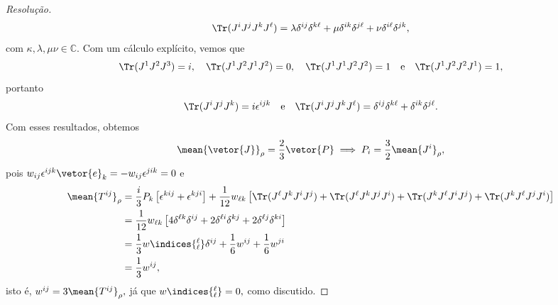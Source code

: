 \begin{proof}[Resolução]
\begin{equation*}
        \Tr(J^i J^j J^k J^\ell) = \lambda \delta^{ij} \delta^{k\ell} + \mu \delta^{i k} \delta^{j \ell} + \nu \delta^{i \ell} \delta^{jk},
    \end{equation*}
    com \(\kappa, \lambda, \mu \nu \in \mathbb{C}\). Com um cálculo explícito, vemos que 
    \begin{equation*}
        \Tr(J^1 J^2 J^3) = i,\quad\Tr(J^1 J^2 J^1 J^2) = 0,\quad \Tr(J^1 J^1 J^2 J^2) = 1\quad\text{e}\quad\Tr(J^1 J^2 J^2 J^1) = 1, 
    \end{equation*}
    portanto 
    \begin{equation*}
        \Tr(J^i J^j J^k) = i \epsilon^{ijk}
        \quad\text{e}\quad
        \Tr(J^i J^j J^k J^\ell) = \delta^{ij} \delta^{k \ell} + \delta^{ik} \delta^{j \ell}.
    \end{equation*}
    Com esses resultados, obtemos
    \begin{equation*}
        \mean{\vetor{J}}_{\rho} = \frac23 \vetor{P} \implies P_i = \frac32 \mean{J^i}_\rho,
    \end{equation*}
    pois \(w_{ij} \epsilon^{ijk} \vetor{e}_k = - w_{ij} \epsilon^{jik} = 0\) e
    \begin{align*}
        \mean{T^{ij}}_{\rho} &= \frac{i}{3} P_k \left[\epsilon^{kij} + \epsilon^{kji}\right] + \frac1{12} w_{\ell k} \left[\Tr(J^\ell J^k J^i J^j) + \Tr(J^\ell J^k J^j J^i) + \Tr(J^k J^\ell J^i J^j) + \Tr(J^k J^\ell J^j J^i)\right]\\
                             &= \frac{1}{12} w_{\ell k} \left[4\delta^{\ell k} \delta^{ij} + 2\delta^{\ell i} \delta^{kj} + 2\delta^{\ell j} \delta^{ki}\right]\\
                             &= \frac13 w\indices{^\ell_\ell}\delta^{ij} + \frac16 w^{ij} + \frac16 w^{ji}\\
                             &= \frac13 w^{ij},
    \end{align*}
    isto é, \(w^{ij} = 3\mean{T^{ij}}_{\rho},\) já que \(w\indices{^\ell_\ell} = 0,\) como discutido.
\end{proof}
